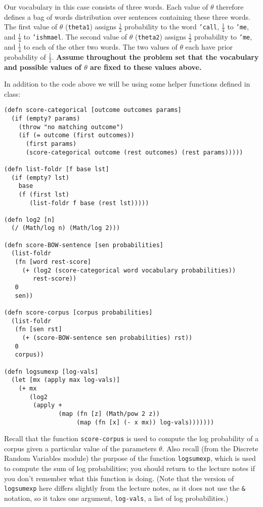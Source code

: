 \documentclass[10pt]{article}
\begin{document}
Our vocabulary in this case consists of three words. Each value of
$\theta$ therefore defines a bag of words distribution over sentences
containing these three words. The first value of $\theta$
(\texttt{theta1}) assigns $\frac{1}{2}$ probability to the word
\texttt{'call}, $\frac{1}{4}$ to \texttt{'me}, and $\frac{1}{4}$ to
\texttt{'ishmael}. The second value of $\theta$ (\texttt{theta2})
assigns $\frac{1}{2}$ probability to \texttt{'me}, and $\frac{1}{4}$
to each of the other two words. The two values of $\theta$ each have
prior probability of $\frac{1}{2}$. \textbf{Assume throughout the
  problem set that the vocabulary and possible values of $\theta$ are
  fixed to these values above.}

In addition to the code above we will be using some helper functions defined in class:

\begin{lstlisting}
(defn score-categorical [outcome outcomes params]
  (if (empty? params)
    (throw "no matching outcome")
    (if (= outcome (first outcomes))
      (first params)
      (score-categorical outcome (rest outcomes) (rest params)))))

(defn list-foldr [f base lst]
  (if (empty? lst)
    base
    (f (first lst)
       (list-foldr f base (rest lst)))))

(defn log2 [n]
  (/ (Math/log n) (Math/log 2)))

(defn score-BOW-sentence [sen probabilities]
  (list-foldr
   (fn [word rest-score]
     (+ (log2 (score-categorical word vocabulary probabilities))
        rest-score))
   0
   sen))

(defn score-corpus [corpus probabilities]
  (list-foldr
   (fn [sen rst]
     (+ (score-BOW-sentence sen probabilities) rst))
   0
   corpus))

(defn logsumexp [log-vals]
  (let [mx (apply max log-vals)]
    (+ mx
       (log2
        (apply +
               (map (fn [z] (Math/pow 2 z))
                    (map (fn [x] (- x mx)) log-vals)))))))
\end{lstlisting}

Recall that the function \texttt{score-corpus} is used to compute the
log probability of a corpus given a particular value of the parameters
$\theta$. Also recall (from the Discrete Random Variables module) the
purpose of the function \texttt{logsumexp}, which is used to compute
the sum of log probabilities; you should return to the lecture notes
if you don't remember what this function is doing. (Note that the
version of \texttt{logsumexp} here differs slightly from the lecture
notes, as it does not use the \texttt{\&} notation, so it takes one
argument, \texttt{log-vals}, a list of log probabilities.)
\end{document}

